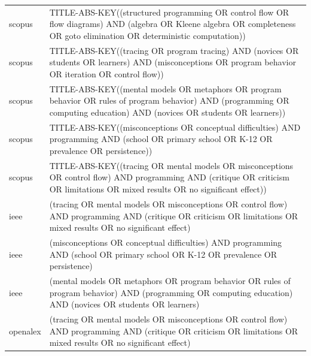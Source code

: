 \documentclass{article}
\begin{document}
\begin{longtable}{lp{10cm}}
scopus & TITLE-ABS-KEY((\textquotedbl{}structured programming\textquotedbl{} OR \textquotedbl{}control flow\textquotedbl{} OR \textquotedbl{}flow diagrams\textquotedbl{}) AND (algebra OR \textquotedbl{}Kleene algebra\textquotedbl{} OR completeness OR \textquotedbl{}goto elimination\textquotedbl{} OR \textquotedbl{}deterministic computation\textquotedbl{})) \\
scopus & TITLE-ABS-KEY((tracing OR \textquotedbl{}program tracing\textquotedbl{}) AND (novices OR students OR learners) AND (misconceptions OR \textquotedbl{}program behavior\textquotedbl{} OR iteration OR \textquotedbl{}control flow\textquotedbl{})) \\
scopus & TITLE-ABS-KEY((\textquotedbl{}mental models\textquotedbl{} OR metaphors OR \textquotedbl{}program behavior\textquotedbl{} OR \textquotedbl{}rules of program behavior\textquotedbl{}) AND (programming OR \textquotedbl{}computing education\textquotedbl{}) AND (novices OR students OR learners)) \\
scopus & TITLE-ABS-KEY((misconceptions OR \textquotedbl{}conceptual difficulties\textquotedbl{}) AND programming AND (school OR \textquotedbl{}primary school\textquotedbl{} OR K-12 OR prevalence OR persistence)) \\
scopus & TITLE-ABS-KEY((tracing OR \textquotedbl{}mental models\textquotedbl{} OR misconceptions OR \textquotedbl{}control flow\textquotedbl{}) AND programming AND (critique OR criticism OR limitations OR \textquotedbl{}mixed results\textquotedbl{} OR \textquotedbl{}no significant effect\textquotedbl{})) \\
ieee & (tracing OR \textquotedbl{}mental models\textquotedbl{} OR misconceptions OR \textquotedbl{}control flow\textquotedbl{}) AND programming AND (critique OR criticism OR limitations OR \textquotedbl{}mixed results\textquotedbl{} OR \textquotedbl{}no significant effect\textquotedbl{}) \\
ieee & (misconceptions OR \textquotedbl{}conceptual difficulties\textquotedbl{}) AND programming AND (school OR \textquotedbl{}primary school\textquotedbl{} OR K-12 OR prevalence OR persistence) \\
ieee & (\textquotedbl{}mental models\textquotedbl{} OR metaphors OR \textquotedbl{}program behavior\textquotedbl{} OR \textquotedbl{}rules of program behavior\textquotedbl{}) AND (programming OR \textquotedbl{}computing education\textquotedbl{}) AND (novices OR students OR learners) \\
openalex & (tracing OR \textquotedbl{}mental models\textquotedbl{} OR misconceptions OR \textquotedbl{}control flow\textquotedbl{}) AND programming AND (critique OR criticism OR limitations OR \textquotedbl{}mixed results\textquotedbl{} OR \textquotedbl{}no significant effect\textquotedbl{}) \\

\end{longtable}
\end{document}
